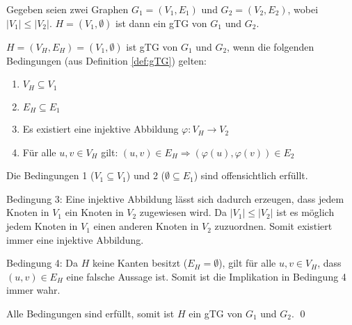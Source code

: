 \begin{myTheo}
Gegeben seien zwei Graphen $G_1 = (V_1,E_1)$ und $G_2=(V_2,E_2)$, wobei 
$|V_1| \leq |V_2|$. $H=(V_1,\emptyset)$ ist dann ein gTG von $G_1$ und $G_2$.
\end{myTheo}

\begin{myProof}
$H=(V_H,E_H)=(V_1,\emptyset)$ ist gTG von $G_1$ und $G_2$, wenn die folgenden 
Bedingungen (aus Definition \ref{def:gTG}) gelten:
\begin{enumerate}
  \item $V_H \subseteq V_1$
  \item $E_H \subseteq E_1$
	\item Es existiert eine injektive Abbildung $\varphi: V_H \rightarrow V_2$
	\item Für alle $u,v \in V_H$ gilt: $(u,v) \in E_H \Rightarrow (\varphi(u),
	      \varphi(v)) \in E_2$
\end{enumerate}

Die Bedingungen 1 ($V_1 \subseteq V_1$) und 2 ($\emptyset \subseteq E_1$) sind 
offensichtlich erfüllt.

Bedingung 3: Eine injektive Abbildung lässt sich dadurch erzeugen, dass jedem 
Knoten in $V_1$ ein Knoten in $V_2$ zugewiesen wird. Da $|V_1| \leq |V_2|$ ist 
es möglich jedem Knoten in $V_1$ einen anderen Knoten in $V_2$ zuzuordnen. 
Somit existiert immer eine injektive Abbildung.

Bedingung 4: Da $H$ keine Kanten besitzt ($E_H=\emptyset$), gilt für alle 
$u,v \in V_H$, dass $(u,v) \in E_H$ eine falsche Aussage ist. Somit ist die 
Implikation in Bedingung 4 immer wahr.

Alle Bedingungen sind erfüllt, somit ist $H$ ein gTG von $G_1$ und $G_2$. \qed
\end{myProof}


